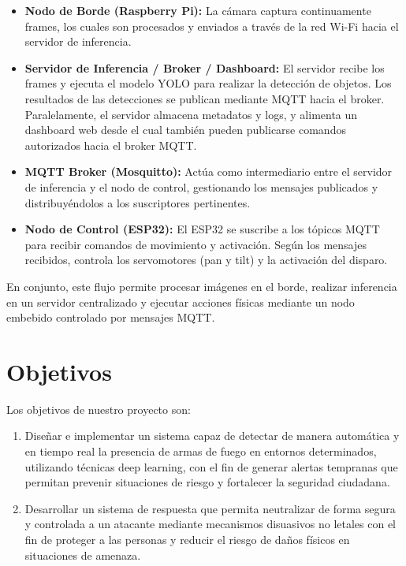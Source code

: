 \documentclass{article}
\begin{document}
\begin{itemize}

    \item \textbf{Nodo de Borde (Raspberry Pi):} 
    La cámara captura continuamente frames, los cuales son procesados y enviados a través de la red Wi-Fi hacia el servidor de inferencia.

    \item \textbf{Servidor de Inferencia / Broker / Dashboard:}
    El servidor recibe los frames y ejecuta el modelo YOLO para realizar la detección de objetos.
    Los resultados de las detecciones se publican mediante MQTT hacia el broker.  
    Paralelamente, el servidor almacena metadatos y logs, y alimenta un dashboard web desde el cual también pueden publicarse comandos autorizados hacia el broker MQTT.

    \item \textbf{MQTT Broker (Mosquitto):}
    Actúa como intermediario entre el servidor de inferencia y el nodo de control, gestionando los mensajes publicados y distribuyéndolos a los suscriptores pertinentes.

    \item \textbf{Nodo de Control (ESP32):}
    El ESP32 se suscribe a los tópicos MQTT para recibir comandos de movimiento y activación.  
    Según los mensajes recibidos, controla los servomotores (pan y tilt) y la activación del disparo.

\end{itemize}

En conjunto, este flujo permite procesar imágenes en el borde, realizar inferencia en un servidor centralizado y ejecutar acciones físicas mediante un nodo embebido controlado por mensajes MQTT.

\section{Objetivos}

Los objetivos de nuestro proyecto son:
\begin{enumerate}
    \item Diseñar e implementar un sistema capaz de detectar de manera automática y en tiempo real la presencia de armas de fuego en entornos determinados, utilizando técnicas deep learning, con el fin de generar alertas tempranas que permitan prevenir situaciones de riesgo y fortalecer la seguridad ciudadana.
    \item Desarrollar un sistema de respuesta que permita neutralizar de forma segura y controlada a un atacante mediante mecanismos disuasivos no letales con el fin de proteger a las personas y reducir el riesgo de daños físicos en situaciones de amenaza.
\end{enumerate}
\end{document}
